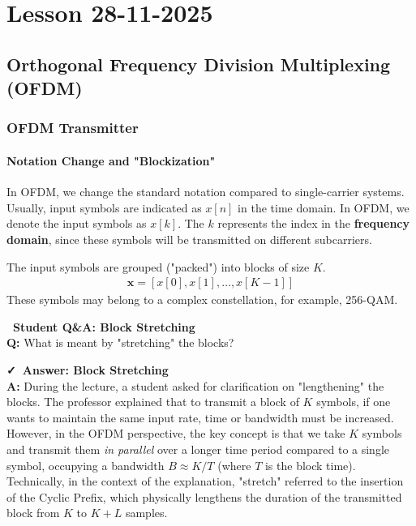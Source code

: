 \documentclass[a4paper, 12pt]{book}
\begin{document}
\setcounter{chapter}{6}
\chapter{Lesson 28-11-2025}
\section{Orthogonal Frequency Division Multiplexing (OFDM)}

\subsection{OFDM Transmitter}

\subsubsection{Notation Change and "Blockization"}
In OFDM, we change the standard notation compared to single-carrier systems. Usually, input symbols are indicated as $x[n]$ in the time domain.
In OFDM, we denote the input symbols as $x[k]$. The $k$ represents the index in the \textbf{frequency domain}, since these symbols will be transmitted on different subcarriers.

The input symbols are grouped ("packed") into blocks of size $K$.
\begin{align}
\mathbf{x} = [x[0], x[1], \dots, x[K-1]]
\end{align}
These symbols may belong to a complex constellation, for example, 256-QAM.

\noindent\colorbox{yellow!25}{
    \parbox{\dimexpr\linewidth-2\fboxsep}{
        \textbf{\faQuestionCircle\ Student Q\&A: Block Stretching} \\
        \small
        \textbf{Q:} What is meant by "stretching" the blocks?
    }
}

\vspace{0.5em} %

\noindent\colorbox{green!15}{
    \parbox{\dimexpr\linewidth-2\fboxsep}{
        \textbf{\faCheck\ Answer: Block Stretching} \\
        \small
        \textbf{A:} During the lecture, a student asked for clarification on "lengthening" the blocks. The professor explained that to transmit a block of $K$ symbols, if one wants to maintain the same input rate, time or bandwidth must be increased. However, in the OFDM perspective, the key concept is that we take $K$ symbols and transmit them \textit{in parallel} over a longer time period compared to a single symbol, occupying a bandwidth $B \approx K/T$ (where $T$ is the block time). Technically, in the context of the explanation, "stretch" referred to the insertion of the Cyclic Prefix, which physically lengthens the duration of the transmitted block from $K$ to $K+L$ samples.
    }
}
\end{document}
